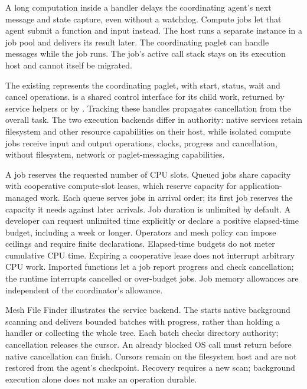 A long computation inside a handler delays the coordinating agent's next
message and state capture, even without a watchdog. Compute jobs let that
agent submit a function and input instead. The host
runs a separate instance in a job pool and delivers its result later.
The coordinating paglet can handle messages while the job runs. The
job's active call stack stays on its execution host and cannot itself
be migrated.

The existing  represents the
coordinating paglet, with start, status, wait and cancel operations.
 is a shared control interface for its child work,
returned by service helpers or by . Tracking
these handles propagates cancellation from the overall task. The two
execution backends differ in authority: native services retain filesystem
and other resource capabilities on their host, while isolated compute
jobs receive input and output operations, clocks, progress and cancellation,
without filesystem, network or paglet-messaging capabilities.

A job reserves the requested number of CPU slots. Queued jobs share
capacity with cooperative compute-slot leases, which reserve capacity
for application-managed work. Each queue serves jobs in arrival order; its first job reserves the
capacity it needs against later arrivals. Job duration is unlimited by
default. A developer can request unlimited time explicitly or declare a
positive elapsed-time budget, including a week or longer. Operators and
mesh policy can impose ceilings and require finite declarations.
Elapsed-time budgets do not meter cumulative CPU time. Expiring a
cooperative lease does not interrupt arbitrary CPU work. Imported
functions let a job report progress and check cancellation; the runtime
interrupts cancelled or over-budget jobs. Job memory allowances are
independent of the coordinator's allowance.

Mesh File Finder illustrates the service backend. The
starts native background scanning and delivers bounded batches with
progress, rather than holding a handler or collecting the whole tree.
Each batch checks directory authority; cancellation releases the cursor.
An already blocked OS call must return before native cancellation can
finish. Cursors remain on the filesystem host and are not restored from
the agent's checkpoint. Recovery requires a new scan; background execution
alone does not make an operation durable.

